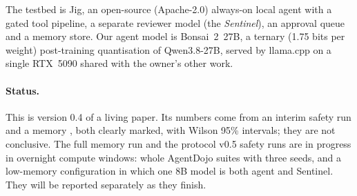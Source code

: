 The testbed is Jig, an open-source (Apache-2.0) always-on local agent with a gated tool pipeline, a
separate reviewer model (the \emph{Sentinel}), an approval queue and a memory store. Our agent model is
Bonsai~2~27B, a ternary (1.75 bits per weight) post-training quantisation of Qwen3.8-27B, served by
llama.cpp on a single RTX~5090 shared with the owner's other work.

\paragraph{Status.} This is version 0.4 of a living paper. Its numbers come from an interim safety run
and a memory \pilot{}, both clearly marked, with Wilson 95\% intervals; they are not conclusive. The full
memory run and the protocol v0.5 safety runs are in progress in overnight compute windows: whole AgentDojo
suites with three seeds, and a low-memory configuration in which one 8B model is both agent and Sentinel.
They will be reported separately as they finish.
